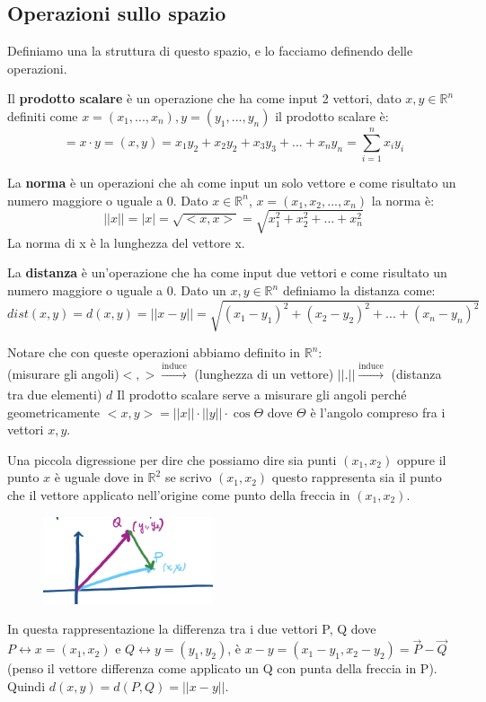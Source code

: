\subsection{Operazioni sullo spazio}
Definiamo una la struttura di questo spazio, e lo facciamo definendo delle operazioni.
\begin{definition}
Il \textbf{prodotto scalare} è un operazione che ha come input 2 vettori, dato $x,y \in \mathbb{R}^n$ definiti come $x= (x_1, ..., x_n), y = (y_1, ..., y_n)$ il prodotto scalare è:
\vspace{-10pt}
\[<x, y> = x \cdot y = (x, y) = x_1y_2 + x_2y_2 + x_3y_3 + ... + x_ny_n = \sum\limits_{i=1}^n x_iy_i\]
\end{definition}
\begin{definition}[Norma]
La \textbf{norma} è un operazioni che ah come input un solo vettore e come risultato un numero maggiore o uguale a 0. Dato $x \in \mathbb{R}^n$, $x = (x_1, x_2, ..., x_n)$ la norma è:
\[||x|| = |x| = \sqrt{<x,x>} = \sqrt{x_1^2 + x_2^2 + ... + x_n^2}\]
La norma di x è la lunghezza del vettore x.
\end{definition}
\begin{definition}[Distanza]
La \textbf{distanza} è un'operazione che ha come input due vettori e come risultato un numero maggiore o uguale a 0. Dato un $x,y \in \mathbb{R}^n$ definiamo la distanza come:
\[dist(x,y) = d(x,y) = ||x - y|| = \sqrt{(x_1 - y_1)^2 + (x_2 - y_2)^2 + ... + (x_n - y_n)^2}\]
\end{definition}

\hspace{-15pt}Notare che con queste operazioni abbiamo definito in $\mathbb{R}^n$:\\
(misurare gli angoli)$<,> \xrightarrow[]{\text{induce}}$ (lunghezza di un vettore) $|| . || \xrightarrow[]{\text{induce}}$ (distanza tra due elementi) $d$
Il prodotto scalare serve a misurare gli angoli perché geometricamente $<x,y> = ||x|| \cdot ||y|| \cdot \cos{\Theta}$ dove $\Theta$ è l'angolo compreso fra i vettori $x,y$.
\begin{note}
Una piccola digressione per dire che possiamo dire sia punti $(x_1, x_2)$ oppure il punto $x$ è uguale dove in $\mathbb{R}^2$ se scrivo $(x_1, x_2)$ questo rappresenta sia il punto che il vettore applicato nell'origine come punto della freccia in $(x_1, x_2)$.
\end{note}
\begin{figure}
    \vspace{-20pt}
    \centering
    \includegraphics[width=5cm]{images/ess-vettore.png}
\end{figure}
In questa rappresentazione la differenza tra i due vettori P, Q dove $P \leftrightarrow x = (x_1, x_2)$ e $Q \leftrightarrow y = (y_1, y_2)$, è $x-y = (x_1 - y_1, x_2 - y_2) = \vec{P} - \vec{Q}$ (penso il vettore differenza come applicato un Q con punta della freccia in P). Quindi $d(x,y) = d(P,Q) = ||x-y||$.

